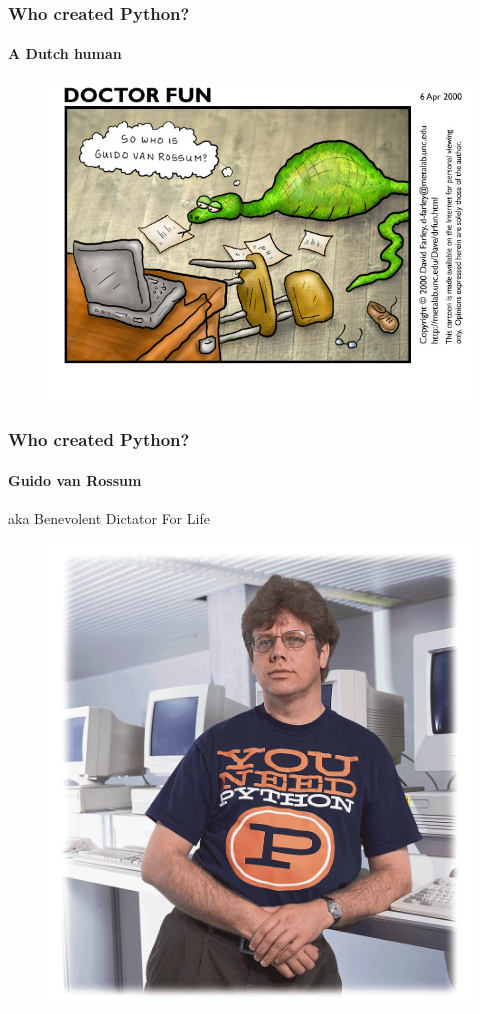 \documentclass{beamer}
\begin{document}
\begin{frame}
\frametitle{Who created Python?}
\framesubtitle{A Dutch human}
\begin{figure}
\includegraphics[scale=0.45]{df20000406.jpg}
\end{figure}

\end{frame}

\begin{frame}
\frametitle{Who created Python?}
\framesubtitle{Guido van Rossum}
\centering aka Benevolent Dictator For Life

\begin{figure}
\includegraphics[scale=0.12]{guido.jpg}
\end{figure}
\end{frame}
\end{document}
